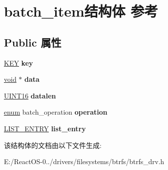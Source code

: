 \hypertarget{structbatch__item}{}\section{batch\+\_\+item结构体 参考}
\label{structbatch__item}
\subsection*{Public 属性}
\begin{DoxyCompactItemize}
\item 
\mbox{\label{structbatch__item_a12dee92e6910953a25337195ab50efd0}} 
\hyperlink{struct_k_e_y}{K\+EY} {\bfseries key}
\item 
\mbox{\label{structbatch__item_a5c88aea13c88bd6048e987d5fbeafa5d}} 
\hyperlink{interfacevoid}{void} $\ast$ {\bfseries data}
\item 
\mbox{\label{structbatch__item_a0f1ae81467f8c6ee9b7e56b4dd8d1872}} 
\hyperlink{_processor_bind_8h_a09f1a1fb2293e33483cc8d44aefb1eb1}{U\+I\+N\+T16} {\bfseries datalen}
\item 
\mbox{\label{structbatch__item_a6d0069d3aef38cadaa02c6b7c840878f}} 
\hyperlink{interfaceenum}{enum} batch\+\_\+operation {\bfseries operation}
\item 
\mbox{\label{structbatch__item_a292796452a52d11112f6c671d31248b4}} 
\hyperlink{struct___l_i_s_t___e_n_t_r_y}{L\+I\+S\+T\+\_\+\+E\+N\+T\+RY} {\bfseries list\+\_\+entry}
\end{DoxyCompactItemize}


该结构体的文档由以下文件生成\+:\begin{DoxyCompactItemize}
\item 
E\+:/\+React\+O\+S-\/0../drivers/filesystems/btrfs/btrfs\+\_\+drv.\+h\end{DoxyCompactItemize}
